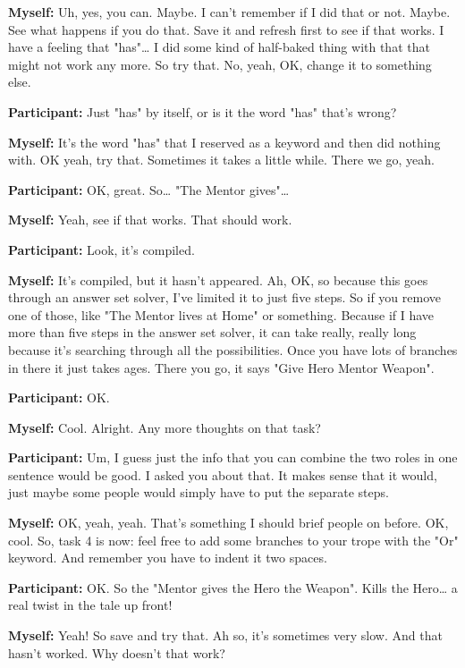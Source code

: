 \documentclass[11pt]{report}
\begin{document}
\begin{linenumbers}
\textbf{Myself:} Uh, yes, you can. Maybe. I can't remember if I did that or not. Maybe. See what happens if you do that. Save it and refresh first to see if that works. I have a feeling that "has"\ldots{} I did some kind of half-baked thing with that that might not work any more. So try that. No, yeah, OK, change it to something else.

\textbf{Participant:} Just "has" by itself, or is it the word "has" that's
wrong?

\textbf{Myself:} It's the word "has" that I reserved as a keyword and then did nothing with. OK yeah, try that. Sometimes it takes a little while. There we go, yeah.

\textbf{Participant:} OK, great. So\ldots{} "The Mentor gives"\ldots{}

\textbf{Myself:} Yeah, see if that works. That should work.

\textbf{Participant:} Look, it's compiled.

\textbf{Myself:} It's compiled, but it hasn't appeared. Ah, OK, so because this
goes through an answer set solver, I've limited it to just five steps. So if you
remove one of those, like "The Mentor lives at Home" or something. Because if I
have more than five steps in the answer set solver, it can take really, really
long because it's searching through all the possibilities. Once you have lots of
branches in there it just takes ages. There you go, it says "Give Hero Mentor
Weapon".

\textbf{Participant:} OK.

\textbf{Myself:} Cool. Alright. Any more thoughts on that task?

\textbf{Participant:} Um, I guess just the info that you can combine the two roles in one sentence would be good. I asked you about that. It makes sense that it would, just maybe some people would simply have to put the separate steps.

\textbf{Myself:} OK, yeah, yeah. That's something I should brief people on before. OK, cool. So, task 4 is now: feel free to add some branches to your trope with the "Or" keyword. And remember you have to indent it two spaces.

\textbf{Participant:} OK. So the "Mentor gives the Hero the Weapon". Kills the Hero\ldots{} a real twist in the tale up front!

\textbf{Myself:} Yeah! So save and try that. Ah so, it's sometimes very slow. And that hasn't worked. Why doesn't that work?


\end{linenumbers}
\end{document}
